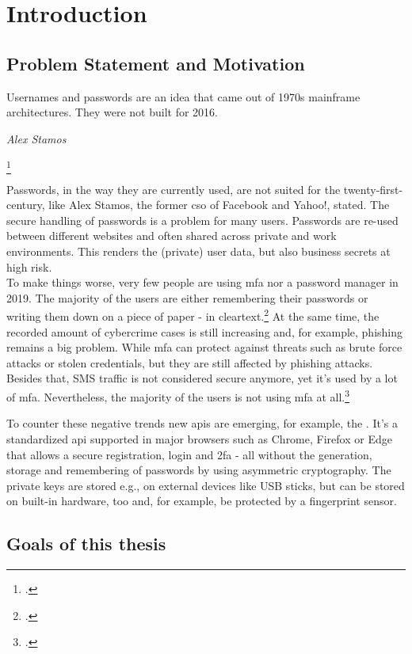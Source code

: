\chapter{Introduction}
\label{chapter:introduction}

\section{Problem Statement and Motivation}

\setlength{}
\epigraph{\frqq Usernames and passwords are an idea that came out of 1970s mainframe architectures. They were not built for 2016.\flqq\footnotemark}{\textit{Alex Stamos}}
\footcitetext[See][]{stamos}

Passwords, in the way they are currently used, are not suited for the twenty-first-century, like Alex Stamos, the former \gls{cso} of Facebook and Yahoo!, stated. The secure handling of passwords is a problem for many users. Passwords are re-used between different websites and often shared across private and work environments. This renders the (private) user data, but also business secrets at high risk.\\
To make things worse, very few people are using \gls{mfa} nor a password manager in 2019. The majority of the users are either remembering their passwords or writing them down on a piece of paper - in cleartext.\footcites[See][]{ibm-security}[See][]{web-de-passwords}
At the same time, the recorded amount of cybercrime cases is still increasing and, for example, phishing remains a big problem. While \gls{mfa} can protect against threats such as brute force attacks or stolen credentials, but they are still affected by phishing attacks. Besides that, SMS traffic is not considered secure anymore, yet it's used by a lot of \gls{mfa}. Nevertheless, the majority of the users is not using \gls{mfa} at all.\footcites[See][]{infratest-dimap}[See][6--7]{bka-cybercrime}

To counter these negative trends new \glspl{api} are emerging, for example, the \wa. It's a standardized \gls{api} supported in major browsers such as Chrome, Firefox or Edge that allows  a secure registration, login and \gls{2fa} - all without the generation, storage and remembering of passwords by using asymmetric cryptography. The private keys are stored e.g., on external devices like USB sticks, but can be stored on built-in hardware, too and, for example, be protected by a fingerprint sensor.

\section{Goals of this thesis}


